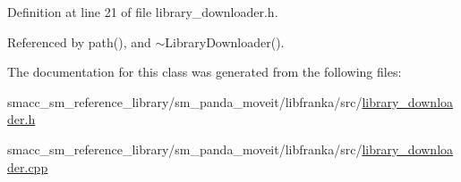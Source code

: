 Definition at line 21 of file library\+\_\+downloader.\+h.



Referenced by path(), and $\sim$\+Library\+Downloader().



The documentation for this class was generated from the following files\+:\begin{DoxyCompactItemize}
\item 
smacc\+\_\+sm\+\_\+reference\+\_\+library/sm\+\_\+panda\+\_\+moveit/libfranka/src/\hyperlink{library__downloader_8h}{library\+\_\+downloader.\+h}\item 
smacc\+\_\+sm\+\_\+reference\+\_\+library/sm\+\_\+panda\+\_\+moveit/libfranka/src/\hyperlink{library__downloader_8cpp}{library\+\_\+downloader.\+cpp}\end{DoxyCompactItemize}
